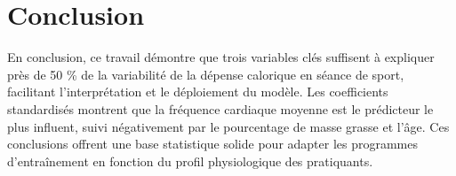 \documentclass[12pt,a4paper]{article}
\begin{document}
\section{Conclusion}
En conclusion, ce travail démontre que trois variables clés suffisent à expliquer près de 50 \% de la variabilité de la dépense calorique en séance de sport, facilitant l’interprétation et le déploiement du modèle. Les coefficients standardisés montrent que la fréquence cardiaque moyenne est le prédicteur le plus influent, suivi négativement par le pourcentage de masse grasse et l’âge. Ces conclusions offrent une base statistique solide pour adapter les programmes d’entraînement en fonction du profil physiologique des pratiquants. 

\newpage
\end{document}
